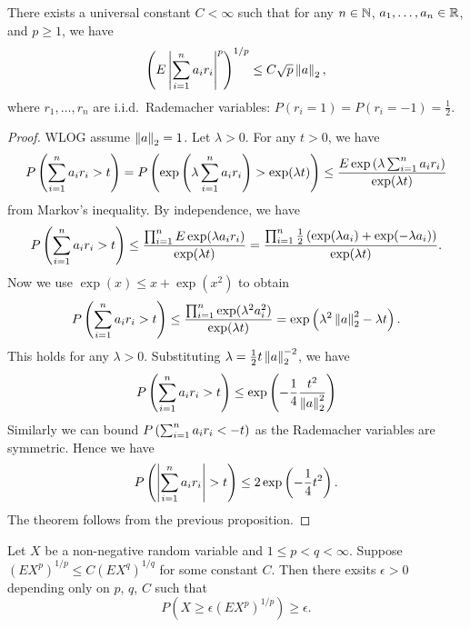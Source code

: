 \documentclass[a4paper]{article}
\begin{document}
\begin{thm}
  There exists a universal constant $C < \infty$ such that for any
  $n \in \mathbb{N}$, $a_1, \dots, a_n \in \mathbb{R}$, and $p \geq 1$, we have
  \[
    \left( E \left\lvert \sum_{i=1}^n a_i r_i\right\rvert^p \right)^{1 / p} \leq
    C \sqrt{p} \left\lVert a\right\rVert_2,
  \]
  where $r_1, \dots, r_n$ are i.i.d.\ Rademacher variables:
  $P \left( r_i = 1 \right) = P \left( r_i = -1 \right)
    = \frac{1}{2}$.
\end{thm}

\begin{proof}
  WLOG assume $\left\lVert a\right\rVert_2= 1$. Let $\lambda > 0$. For any $t > 0$, we have
  \begin{align*}
    P \left( \sum_{i=1}^n a_i r_i > t \right)
    = P \left( \exp \left( \lambda \sum_{i=1}^n a_i r_i \right)
    > \exp (\lambda t) \right)
    \leq \frac{E \exp \left( \lambda \sum_{i=1}^n a_i r_i \right)}
         {\exp (\lambda t)}
  \end{align*}
  from Markov's inequality. By independence, we have
  \begin{align*}
    P \left( \sum_{i=1}^n a_i r_i > t \right)
    \leq \frac{\prod_{i=1}^{n} E \exp (\lambda a_i r_i) }{\exp (\lambda t)}
    = \frac{\prod_{i=1}^n \frac{1}{2} \left( \exp (\lambda a_i) +
        \exp (- \lambda a_i) \right) }{\exp (\lambda t)}.
  \end{align*}
  Now we use $\exp (x) \leq x + \exp (x^2)$ to obtain
  \begin{align*}
    P \left( \sum_{i=1}^n a_i r_i > t \right)
    \leq \frac{\prod_{i=1}^n \exp (\lambda^2 a_i^2)}{\exp (\lambda t)}
    = \exp \left( \lambda^2 \left\lVert a\right\rVert^2_2 - \lambda t \right).
  \end{align*}
  This holds for any $\lambda > 0$. Substituting $\lambda =
    \frac{1}{2} t \left\lVert a\right\rVert^{-2}_2$, we have
  \[
    P \left( \sum_{i=1}^n a_i r_i > t \right) \leq \exp \left( -\frac{1}{4}
    \frac{t^2}{\left\lVert a\right\rVert^2_2} \right)
  \]
  Similarly we can bound $P \left( \sum_{i=1}^n a_i r_i < -t \right)$
  as the Rademacher variables are symmetric. Hence we have
  \[
    P \left( \left\lvert \sum_{i=1}^n a_i r_i\right\rvert > t \right) \leq 2
    \exp \left( -\frac{1}{4} t^2 \right).
  \]
  The theorem follows from the previous proposition.

\end{proof}

\begin{thm}
  Let $X$ be a non-negative random variable and $1 \leq p < q < \infty$.
  Suppose $\left( E X^p \right)^{1 / p} \leq C \left( E X^q \right)^{1 / q}$
  for some constant $C$. Then there exsits $\epsilon > 0$ depending
  only on $p$, $q$, $C$ such that
  \[
    P \left( X \geq \epsilon \left( E X^p \right)^{1 / p} \right)
    \geq \epsilon.
  \]
\end{thm}
\end{document}
